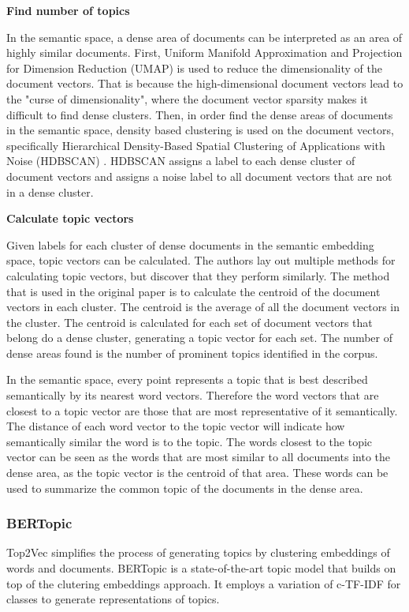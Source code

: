 \documentclass{article}
\begin{document}
\textbf{Find number of topics}

In the semantic space, a dense area of documents can be interpreted as an area of highly similar documents. First, Uniform Manifold Approximation and Projection for Dimension Reduction (UMAP) \cite{mcinnes_umap_2020} is used to reduce the dimensionality of the document vectors. That is because the high-dimensional document vectors lead to the "curse of dimensionality", where the document vector sparsity makes it difficult to find dense clusters. Then, in order find the dense areas of documents in the semantic space, density based clustering is used on the document vectors, specifically Hierarchical Density-Based Spatial Clustering of Applications with Noise (HDBSCAN) \cite{campello_density-based_2013, mcinnes_accelerated_2017, mcinnes_hdbscan_2017}. HDBSCAN assigns a label to each dense cluster of document vectors and assigns a noise label to all document vectors that are not in a dense cluster.


\textbf{Calculate topic vectors}

Given labels for each cluster of dense documents in the semantic embedding space, topic vectors can be calculated. The authors lay out multiple methods for calculating topic vectors, but discover that they perform similarly. The method that is used in the original paper is to calculate the centroid of the document vectors in each cluster. The centroid is the average of all the document vectors in the cluster. The centroid is calculated for each set of document vectors that belong do a dense cluster, generating a topic vector for each set. The number of dense areas found is the number of prominent topics identified in the corpus.

In the semantic space, every point represents a topic that is best described semantically by its nearest word vectors. Therefore the word vectors that are closest to a topic vector are those that are most representative of it semantically. The distance of each word vector to the topic vector will indicate how semantically similar the word is to the topic. The words closest to the topic vector can be seen as the words that are most similar to all documents into the dense area, as the topic vector is the centroid of that area. These words can be used to summarize the common topic of the documents in the dense area.

\subsubsection{BERTopic}
Top2Vec simplifies the process of generating topics by clustering embeddings of words and documents. BERTopic \cite{grootendorst_bertopic_2022} is a state-of-the-art topic model that builds on top of the clutering embeddings approach. It employs a variation of c-TF-IDF for classes to generate representations of topics.
\end{document}
